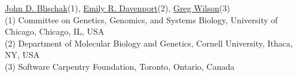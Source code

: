 \href{https://www.authorea.com/users/5990}{John D. Blischak}(1), \href{https://www.authorea.com/users/16152}{Emily R. Davenport}(2), \href{https://www.authorea.com/users/18131}{Greg Wilson}(3)\\

(1) Committee on Genetics, Genomics, and Systems Biology, University of Chicago, Chicago, IL, USA\\
(2) Department of Molecular Biology and Genetics, Cornell University, Ithaca, NY, USA\\
(3) Software Carpentry Foundation, Toronto, Ontario, Canada

